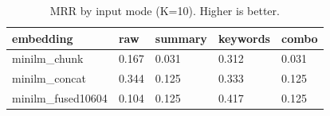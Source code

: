 \begin{table}
\caption{MRR by input mode (K=10). Higher is better.}
\label{tab:mrr-by-mode}
\begin{tabular}{lllll}
\toprule
embedding & raw & summary & keywords & combo \\
\midrule
minilm_chunk & 0.167 & 0.031 & 0.312 & 0.031 \\
minilm_concat & 0.344 & 0.125 & 0.333 & 0.125 \\
minilm_fused10604 & 0.104 & 0.125 & 0.417 & 0.125 \\
\bottomrule
\end{tabular}
\end{table}
